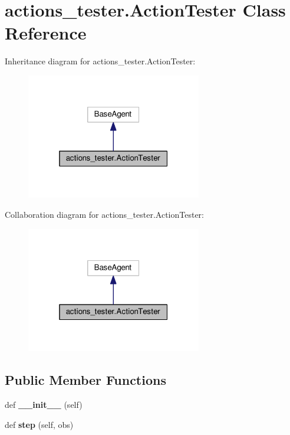 \hypertarget{classactions__tester_1_1ActionTester}{}\section{actions\+\_\+tester.\+Action\+Tester Class Reference}
\label{classactions__tester_1_1ActionTester}


Inheritance diagram for actions\+\_\+tester.\+Action\+Tester\+:\nopagebreak
\begin{figure}[H]
\begin{center}
\leavevmode
\includegraphics[width=217pt]{classactions__tester_1_1ActionTester__inherit__graph}
\end{center}
\end{figure}


Collaboration diagram for actions\+\_\+tester.\+Action\+Tester\+:\nopagebreak
\begin{figure}[H]
\begin{center}
\leavevmode
\includegraphics[width=217pt]{classactions__tester_1_1ActionTester__coll__graph}
\end{center}
\end{figure}
\subsection*{Public Member Functions}
\begin{DoxyCompactItemize}
\item 
def {\bfseries \+\_\+\+\_\+init\+\_\+\+\_\+} (self)\hypertarget{classactions__tester_1_1ActionTester_a4a120ce4023e1a7ca13cc46611cec779}{}\label{classactions__tester_1_1ActionTester_a4a120ce4023e1a7ca13cc46611cec779}

\item 
def {\bfseries step} (self, obs)\hypertarget{classactions__tester_1_1ActionTester_ad2461d03ad6727b2526bf524de3c4978}{}\label{classactions__tester_1_1ActionTester_ad2461d03ad6727b2526bf524de3c4978}

\end{DoxyCompactItemize}


